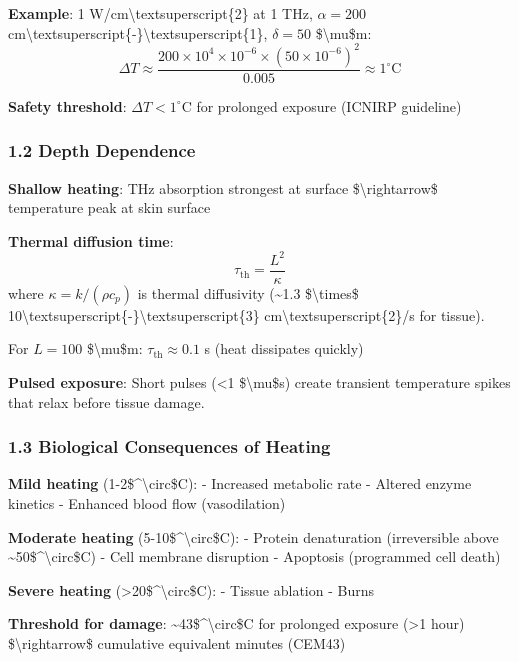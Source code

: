 \textbf{Example}: 1 W/cm\textbackslash textsuperscript\{2\} at 1 THz,
\(\alpha = 200\)
cm\textbackslash textsuperscript\{-\}\textbackslash textsuperscript\{1\},
\(\delta = 50\) \$\textbackslash mu\$m:
\[\Delta T \approx \frac{200 \times 10^4 \times 10^{-6} \times (50 \times 10^{-6})^2}{0.005} \approx 1^\circ\text{C}\]

\textbf{Safety threshold}: \(\Delta T < 1^\circ\)C for prolonged
exposure (ICNIRP guideline)

\subsubsection{1.2 Depth Dependence}\label{depth-dependence}

\textbf{Shallow heating}: THz absorption strongest at surface
\$\textbackslash rightarrow\$ temperature peak at skin surface

\textbf{Thermal diffusion time}:
\[\tau_{\text{th}} = \frac{L^2}{\kappa}\] where
\(\kappa = k/(\rho c_p)\) is thermal diffusivity (\textasciitilde1.3
\$\textbackslash times\$
10\textbackslash textsuperscript\{-\}\textbackslash textsuperscript\{3\}
cm\textbackslash textsuperscript\{2\}/s for tissue).

For \(L = 100\) \$\textbackslash mu\$m: \(\tau_{\text{th}} \approx 0.1\)
s (heat dissipates quickly)

\textbf{Pulsed exposure}: Short pulses (\textless1
\$\textbackslash mu\$s) create transient temperature spikes that relax
before tissue damage.

\subsubsection{1.3 Biological Consequences of
Heating}\label{biological-consequences-of-heating}

\textbf{Mild heating} (1-2\$\^{}\textbackslash circ\$C): - Increased
metabolic rate - Altered enzyme kinetics - Enhanced blood flow
(vasodilation)

\textbf{Moderate heating} (5-10\$\^{}\textbackslash circ\$C): - Protein
denaturation (irreversible above
\textasciitilde50\$\^{}\textbackslash circ\$C) - Cell membrane
disruption - Apoptosis (programmed cell death)

\textbf{Severe heating} (\textgreater20\$\^{}\textbackslash circ\$C): -
Tissue ablation - Burns

\textbf{Threshold for damage}:
\textasciitilde43\$\^{}\textbackslash circ\$C for prolonged exposure
(\textgreater1 hour) \$\textbackslash rightarrow\$ cumulative equivalent
minutes (CEM43)

